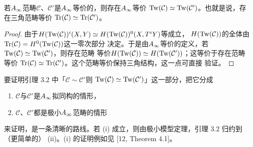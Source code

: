 \begin{lemma}[{[20, Lemma 3.25]}]\label{lem:c02-3.2}
若$A_{\infty}$范畴$\mathcal{C}$、$\mathcal{C}'$是$A_{\infty}$等价的，则存在$A_{\infty}$等价
$\operatorname{Tw}(\mathcal{C})\simeq\operatorname{Tw}(\mathcal{C}')$。也就是说，存在三角范畴等价
$\operatorname{Tr}(\mathcal{C})\simeq\operatorname{Tr}(\mathcal{C}')$。
\end{lemma}

\begin{proof}
由于$H(\operatorname{Tw}(\mathcal{C}))^{i}(X,Y)\simeq H(\operatorname{Tw}(\mathcal{C}))^{0}(X,T^{i}Y)$等成立，
$H(\operatorname{Tw}(\mathcal{C}))$的全体由$\operatorname{Tr}(\mathcal{C})=H^{0}(\operatorname{Tw}(\mathcal{C}))$这一零次部分
决定。于是由$A_{\infty}$等价的定义，若$\operatorname{Tw}(\mathcal{C})\simeq\operatorname{Tw}(\mathcal{C}')$，则存在范畴
等价$H(\operatorname{Tw}(\mathcal{C}))\simeq H(\operatorname{Tw}(\mathcal{C}'))$；这等价于存在范畴等价
$\operatorname{Tr}(\mathcal{C})\simeq\operatorname{Tr}(\mathcal{C}')$。这个范畴等价保持三角结构，这一点可直接
验证。
\end{proof}

要证明引理 3.2 中「$\mathcal{C}\sim\mathcal{C}'$则
$\operatorname{Tw}(\mathcal{C})\simeq\operatorname{Tw}(\mathcal{C}')$」这一部分，把它分成
\begin{enumerate}[label=(\roman*),leftmargin=3em,itemsep=1pt,topsep=2pt]
\item $\mathcal{C}$与$\mathcal{C}'$是$A_{\infty}$拟同构的情形，
\item $\mathcal{C}$、$\mathcal{C}'$都是极小$A_{\infty}$范畴的情形
\end{enumerate}
来证明，是一条清晰的路线。若 (i) 成立，则由极小模型定理，引理 3.2 归约到（更简单的）
(ii)。(i) 的证明例如见 [12, Theorem 4.1]。
